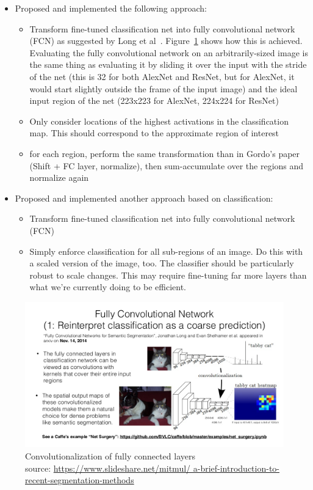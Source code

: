 \documentclass[fleqn]{article}
\begin{document}
\begin{itemize}
    \item Proposed and implemented the following approach:
    \begin{itemize}
        \item Transform fine-tuned classification net into fully
        convolutional network (FCN) as suggested by
        Long et al~\cite{long_fully_2015}. Figure~\ref{fig:fcn} shows
        how this is achieved. Evaluating the fully convolutional network
        on an arbitrarily-sized image is the same thing as evaluating it
        by sliding it over the input with the stride of the net (this is
        32 for both AlexNet and ResNet, but for AlexNet, it would start
        slightly outside the frame of the input image) and the ideal
        input region of the net (223x223 for AlexNet, 224x224 for ResNet)
        \item Only consider locations of the highest activations
        in the classification map. This should correspond to the
        approximate region of interest
        \item for each region, perform the same transformation than
        in Gordo's paper (Shift + FC layer, normalize),
        then sum-accumulate over the regions and normalize again
    \end{itemize}
    \item Proposed and implemented another approach based on classification:
    \begin{itemize}
        \item Transform fine-tuned classification net into fully
        convolutional network (FCN)
        \item Simply enforce classification for all sub-regions of an image.
        Do this with a scaled version of the image, too. The classifier
        should be particularly robust to scale changes. This may require
        fine-tuning far more layers than what we're currently doing to be
        efficient.
    \end{itemize}
\end{itemize}

\begin{figure}
\includegraphics[width=\textwidth]{./img/fcn_slide.jpg}
\caption[caption]{Convolutionalization of fully connected layers
\\\hspace{\textwidth}source:
\url{https://www.slideshare.net/mitmul/
a-brief-introduction-to-recent-segmentation-methods}\label{fig:fcn}}
\end{figure}
\end{document}
